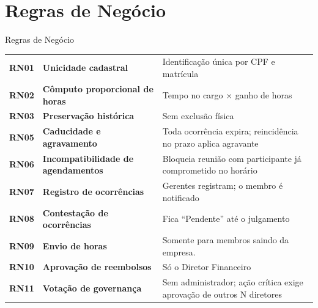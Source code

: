 \documentclass[aspectratio=169,9pt]{beamer}
\begin{document}
\section{Regras de Negócio}
\begin{frame}{Regras de Negócio}
  \small
  \renewcommand{\arraystretch}{1.2}
  \begin{tabular}{@{}l>{\bfseries}P{4.6cm}P{7.2cm}@{}}
    \toprule
    \textcolor{cefet}{\textbf{RN01}} & Unicidade cadastral & Identificação única por CPF e matrícula \\
    \textcolor{cefet}{\textbf{RN02}} & Cômputo proporcional de horas & Tempo no cargo $\times$ ganho de horas \\
    \textcolor{cefet}{\textbf{RN03}} & Preservação histórica & Sem exclusão física \\
    \textcolor{cefet}{\textbf{RN05}} & Caducidade e agravamento & Toda ocorrência expira; reincidência no prazo aplica agravante \\
    \textcolor{cefet}{\textbf{RN06}} & Incompatibilidade de agendamentos & Bloqueia reunião com participante já comprometido no horário \\
    \textcolor{cefet}{\textbf{RN07}} & Registro de ocorrências & Gerentes registram; o membro é notificado \\
    \textcolor{cefet}{\textbf{RN08}} & Contestação de ocorrências & Fica ``Pendente'' até o julgamento\\
    \textcolor{cefet}{\textbf{RN09}} & Envio de horas & Somente para membros saindo da empresa.  \\
    \textcolor{cefet}{\textbf{RN10}} & Aprovação de reembolsos & Só o Diretor Financeiro \\
    \textcolor{cefet}{\textbf{RN11}} & Votação de governança & Sem administrador; ação crítica exige aprovação de outros N diretores \\
    \bottomrule
  \end{tabular}
\end{frame}

\end{document}

